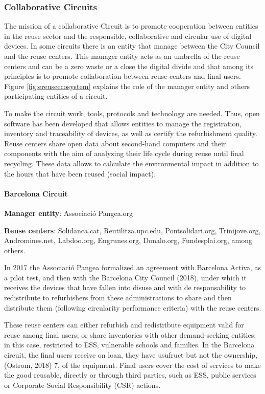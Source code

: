 \documentclass[
]{book}
\begin{document}
\hypertarget{collaborative-circuits}{%
\subsubsection{Collaborative Circuits}\label{collaborative-circuits}}

The mission of a collaborative Circuit is to promote cooperation between entities in the reuse sector and the responsible, collaborative and circular use of digital devices. In some circuits there is an entity that manage between the City Council and the reuse centers. This manager entity acts as an umbrella of the reuse centers and can be a zero waste or a close the digital divide and that among its principles is to promote collaboration between reuse centers and final users. Figure \ref{fig:ereuseecosystem} explains the role of the manager entity and others participating entities of a circuit.

To make the circuit work, tools, protocols and technology are needed. Thus, open software has been developed that allows entities to manage the registration, inventory and traceability of devices, as well as certify the refurbishment quality. Reuse centers share open data about second-hand computers and their components with the aim of analyzing their life cycle during reuse until final recycling. These data allows to calculate the environmental impact in addition to the hours that have been reused (social impact).

\hypertarget{barcelona-circuit}{%
\paragraph{Barcelona Circuit}\label{barcelona-circuit}}

\textbf{Manager entity}: Associació Pangea.org

\textbf{Reuse centers}: Solidanca.cat, Reutilitza.upc.edu, Pontsolidari.org, Trinijove.org, Andromines.net, Labdoo.org, Engrunes.org, Donalo.org, Fundesplai.org, among others.

In 2017 the Associació Pangea formalized an agreement with Barcelona Activa, as a pilot test, and then with the Barcelona City Council (2018), under which it receives the devices that have fallen into disuse and with de responsability to redistribute to refurbishers from these administrations to share and then distribute them (following circularity performance criteria) with the reuse centers.

These reuse centers can either refurbish and redistribute equipment valid for reuse among final users; or share inventories with other demand-seeking entities; in this case, restricted to ESS, vulnerable schools and families. In the Barcelona circuit, the final users receive on loan, they have usufruct but not the ownership, (Ostrom, 2018) 7, of the equipment. Final users cover the cost of services to make the good reusable, directly or through third parties, such as ESS, public services or Corporate Social Responsibility (CSR) actions.
\end{document}
